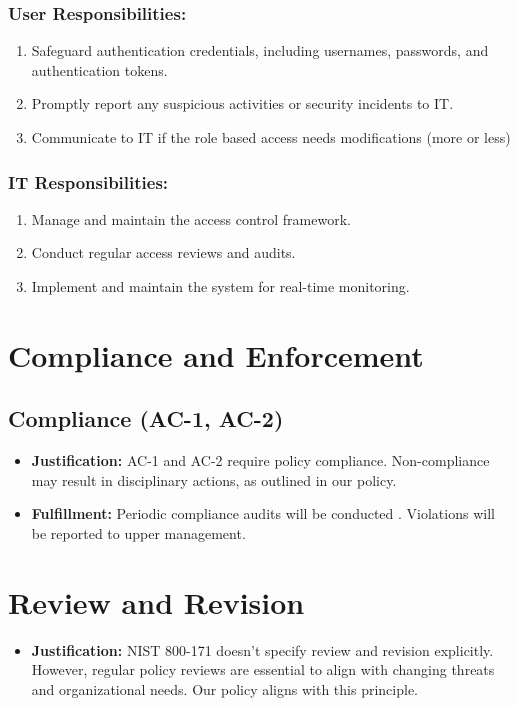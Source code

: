 \subsubsection{\textbf{User Responsibilities:}}
\begin{enumerate}[label=\alph*.]
    \item Safeguard authentication credentials, including usernames, passwords, and authentication tokens.
    \item Promptly report any suspicious activities or security incidents to IT.
    \item Communicate to IT if the role based access needs modifications (more or less)
\end{enumerate}

\subsubsection{\textbf{IT Responsibilities:}}
\begin{enumerate}[label=\alph*.]
    \item Manage and maintain the access control framework.
    \item Conduct regular access reviews and audits.
    \item Implement and maintain the system for real-time monitoring.
\end{enumerate}

\section{Compliance and Enforcement}

\subsection{Compliance (AC-1, AC-2)}
\begin{itemize}
    \item \textbf{Justification:} AC-1 and AC-2 require policy compliance. Non-compliance may result in disciplinary actions, as outlined in our policy.
    \item \textbf{Fulfillment:} Periodic compliance audits will be conducted . Violations will be reported to upper management.
\end{itemize}

\section{Review and Revision}

\begin{itemize}
    \item \textbf{Justification:} NIST 800-171 doesn't specify review and revision explicitly. However, regular policy reviews are essential to align with changing threats and organizational needs. Our policy aligns with this principle.
\end{itemize}